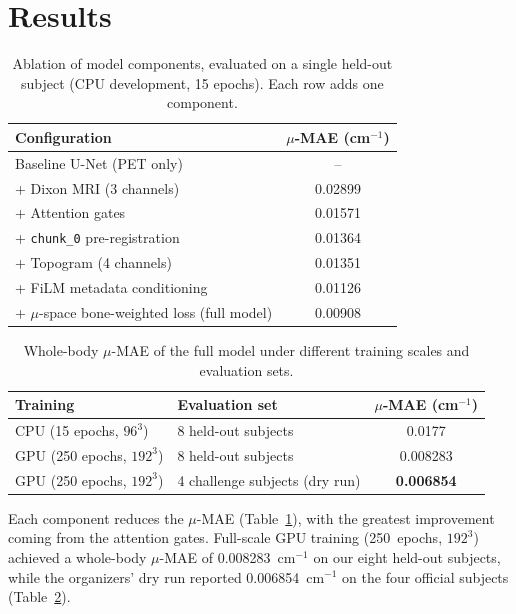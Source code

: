 \documentclass{article}
\begin{document}
\section{Results}

\begin{table}[h!]
  \caption{Ablation of model components, evaluated on a single held-out subject
  (CPU development, 15 epochs). Each row adds one component.}
  \centering
  \begin{tabular}{lc}
    \toprule
    Configuration & $\mu$-MAE (cm$^{-1}$) \\
    \midrule
    Baseline U-Net (PET only)                     & -- \\
    + Dixon MRI (3 channels)                       & 0.02899 \\
    + Attention gates                              & 0.01571 \\
    + \texttt{chunk\_0} pre-registration           & 0.01364 \\
    + Topogram (4 channels)                        & 0.01351 \\
    + FiLM metadata conditioning                   & 0.01126 \\
    + $\mu$-space bone-weighted loss (full model)  & 0.00908 \\
    \bottomrule
  \end{tabular}
  \label{tab:ablation}
\end{table}


\begin{table}[h!]
  \caption{Whole-body $\mu$-MAE of the full model under different training scales
  and evaluation sets.}
  \centering
  \begin{tabular}{llc}
    \toprule
    Training & Evaluation set & $\mu$-MAE (cm$^{-1}$) \\
    \midrule
    CPU (15 epochs, $96^3$)    & 8 held-out subjects                 & 0.0177 \\
    GPU (250 epochs, $192^3$)  & 8 held-out subjects                 & 0.008283 \\
    GPU (250 epochs, $192^3$)  & 4 challenge subjects (dry run)      & \textbf{0.006854} \\
    \bottomrule
  \end{tabular}
  \label{tab:final}
\end{table}


Each component reduces the $\mu$-MAE (Table~\ref{tab:ablation}), with the greatest improvement coming from the attention gates. Full-scale GPU training (250~epochs, $192^3$) achieved a whole-body $\mu$-MAE of 0.008283~cm$^{-1}$ on our eight held-out
subjects, while the organizers' dry run reported 0.006854~cm$^{-1}$ on the four official subjects (Table~\ref{tab:final}).
\end{document}
